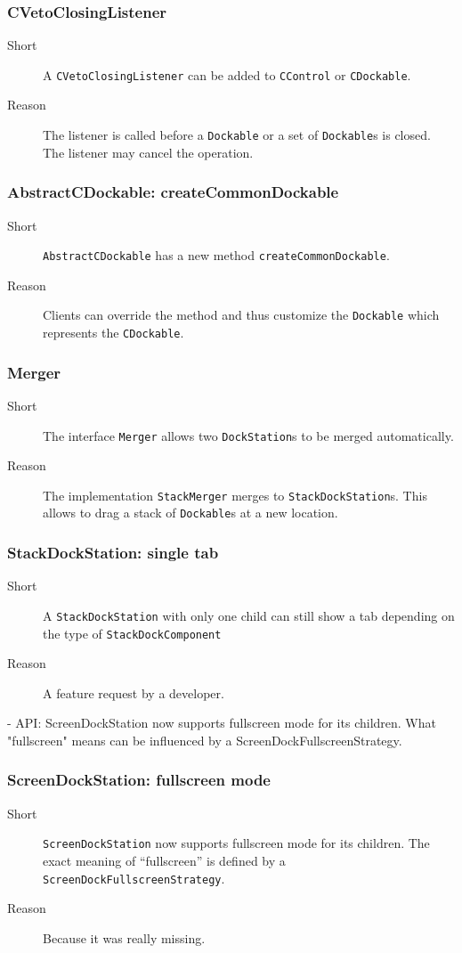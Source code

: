 \documentclass[a4paper,10pt]{article}
\newcommand{\src}[1]{\lstinline[basicstyle=\normalsize\ttfamily,keywordstyle=\normalsize\ttfamily,identifierstyle=\normalsize\ttfamily]|#1|}
\newcommand{\short}{\item[Short]}
\newcommand{\why}{\item[Reason]}
\begin{document}
\subsubsection{CVetoClosingListener}
\begin{description}
 \short A \src{CVetoClosingListener} can be added to \src{CControl} or \src{CDockable}.
 \why The listener is called before a \src{Dockable} or a set of \src{Dockable}s is closed. The listener may cancel the operation.
\end{description}

\subsubsection{AbstractCDockable: createCommonDockable}
\begin{description}
 \short \src{AbstractCDockable} has a new method \src{createCommonDockable}.
 \why Clients can override the method and thus customize the \src{Dockable} which represents the \src{CDockable}.
\end{description}

\subsubsection{Merger}
\begin{description}
 \short The interface \src{Merger} allows two \src{DockStation}s to be merged automatically.
 \why The implementation \src{StackMerger} merges to \src{StackDockStation}s. This allows to drag a stack of \src{Dockable}s at a new location.
\end{description}

\subsubsection{StackDockStation: single tab}
\begin{description}
 \short A \src{StackDockStation} with only one child can still show a tab depending on the type of \src{StackDockComponent}
 \why A feature request by a developer.
\end{description}

- API: ScreenDockStation now supports fullscreen mode for its children. What "fullscreen" means can be influenced by a ScreenDockFullscreenStrategy.

\subsubsection{ScreenDockStation: fullscreen mode}
\begin{description}
 \short \src{ScreenDockStation} now supports fullscreen mode for its children. The exact meaning of ``fullscreen'' is defined by a \src{ScreenDockFullscreenStrategy}.
 \why Because it was really missing.
\end{description}
\end{document}
